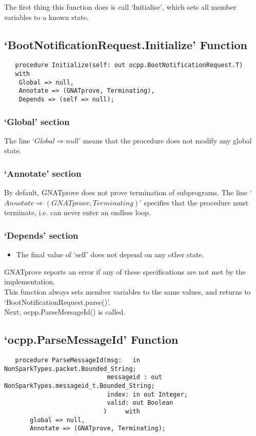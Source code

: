 \documentclass[12pt,openany,a4paper]{book}
\begin{document}
The first thing this function does is call `Initialise', which sets all member variables to a known state.


\subsection{`BootNotificationRequest.Initialize' Function}
\begin{verbatim}
   procedure Initialize(self: out ocpp.BootNotificationRequest.T)
   with
    Global => null,
    Annotate => (GNATprove, Terminating),
    Depends => (self => null);
\end{verbatim}
\subsubsection{`Global' section}
The line `$Global \Rightarrow null$' means that the procedure does not modify any global state.
\subsubsection{`Annotate' section}
By default, GNATprove does not prove termination of subprograms. The line `$Annotate \Rightarrow (GNATprove, Terminating)$' specifies that the procedure must terminate, i.e. can never enter an endless loop. 
\subsubsection{`Depends' section}
\begin{itemize}
\item The final value of `self' does not depend on any other state. 
\end{itemize}
GNATprove reports an error if any of these specifications are not met by the implementation.\\

This function always sets member variables to the same values, and returns to `BootNotificationRequest.parse()'.\\

Next, ocpp.ParseMessageId() is called.
\subsection{`ocpp.ParseMessageId' Function}
\begin{verbatim}
   procedure ParseMessageId(msg:   in  NonSparkTypes.packet.Bounded_String;
                            messageid : out NonSparkTypes.messageid_t.Bounded_String;
                            index: in out Integer;
                            valid: out Boolean
                           )     with
       global => null,
       Annotate => (GNATprove, Terminating);

\end{verbatim}
\end{document}
